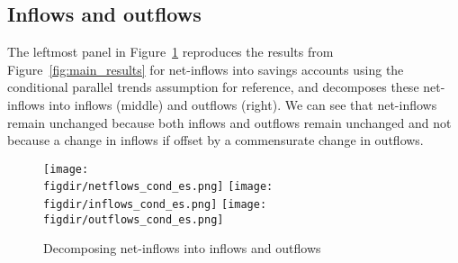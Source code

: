 \subsection{Inflows and outflows}%
\label{sub:inflows_and_outflows}

The leftmost panel in Figure~\ref{fig:in_out_results} reproduces the results from
Figure~\ref{fig:main_results} for net-inflows into savings accounts using the
conditional parallel trends assumption for reference, and decomposes these
net-inflows into inflows (middle) and outflows (right). We can see that
net-inflows remain unchanged because both inflows and outflows remain
unchanged and not because a change in inflows if offset by a commensurate
change in outflows.

\begin{figure}[H]
    \centering
    \caption{Decomposing net-inflows into inflows and outflows}%
    \label{fig:in_out_results}
    \texttt{[image: \\figdir/netflows\_cond\_es.png]}
    \texttt{[image: \\figdir/inflows\_cond\_es.png]}
    \texttt{[image: \\figdir/outflows\_cond\_es.png]}
\end{figure}

